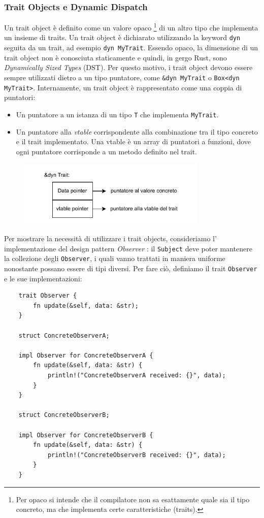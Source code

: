 \subsubsection{Trait Objects e Dynamic Dispatch}
\label{sec:trait_objects}
Un trait object è definito come un valore opaco \footnote{Per opaco si intende che il compilatore non sa esattamente quale sia il tipo concreto, ma che implementa certe caratteristiche (traits).} di un altro tipo che implementa un insieme di traits.  Un trait object è dichiarato utilizzando la keyword \texttt{dyn} seguita da un trait, ad esempio \texttt{dyn MyTrait}. Essendo opaco, la dimensione di un trait object non è conosciuta staticamente e quindi, in gergo Rust, sono \textit{Dynamically Sized Types} (DST). Per questo motivo, i trait object devono essere sempre utilizzati dietro a un tipo puntatore, come \texttt{\&dyn MyTrait} o \texttt{Box<dyn MyTrait>}. Internamente, un trait object è rappresentato come una coppia di puntatori:
\begin{itemize}
    \item Un puntatore a un istanza di un tipo \texttt{T} che implementa \texttt{MyTrait}.
    \item Un puntatore alla \textit{vtable} corrispondente alla combinazione tra il tipo concreto e il trait implementato. Una vtable è un array di puntatori a funzioni, dove ogni puntatore corrisponde a un metodo definito nel trait.
\end{itemize}  
\begin{figure}[H]
    \centering
    \includegraphics[width=0.8\textwidth]{Figures/vtable.drawio.pdf}
\end{figure}
Per mostrare la necessità di utilizzare i trait objects, consideriamo l' implementazione del design pattern \textit{Observer} \cite{gamma-design-patterns}: il \texttt{Subject} deve poter mantenere la collezione degli \texttt{Observer}, i quali vanno trattati in maniera uniforme nonostante possano essere di tipi diversi. Per fare ciò, definiamo il trait \texttt{Observer} e le sue implementazioni:
\begin{verbatim}
    trait Observer {
        fn update(&self, data: &str);
    }

    struct ConcreteObserverA;

    impl Observer for ConcreteObserverA {
        fn update(&self, data: &str) {
            println!("ConcreteObserverA received: {}", data);
        }
    }

    struct ConcreteObserverB;

    impl Observer for ConcreteObserverB {
        fn update(&self, data: &str) {
            println!("ConcreteObserverB received: {}", data);
        }
    }
\end{verbatim}
